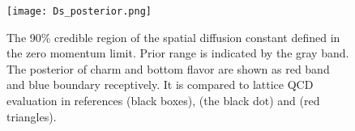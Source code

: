 \begin{figure}
\centering
\texttt{[image: Ds\_posterior.png]}
\caption{The 90\% credible region of the spatial diffusion constant defined in the zero momentum limit. Prior range is indicated by the gray band. The posterior of charm and bottom flavor are shown as red band and blue boundary receptively. It is compared to lattice QCD evaluation in references \cite{Banerjee:2011ra} (black boxes), \cite{Francis:2015daa} (the black dot) and \cite{Ding:2012sp} (red triangles).}
\label{fig:new:posterior-Ds}
\end{figure}